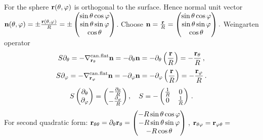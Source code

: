 \documentclass[12pt]{article}
\theoremstyle{theorem}
\numberwithin{equation}{section}
\begin{document}
For the sphere ${\bf r}(\theta,\varphi)$ is orthogonal to the surface.
       Hence
   normal unit vector
   $   {\bf n}(\theta,\varphi)=\pm {{\bf r}(\theta,\varphi)\over R}=\pm
   \begin{pmatrix}
    \sin\theta\cos\varphi\cr
     \sin\theta\sin\varphi\cr
      \cos\theta\cr
   \end{pmatrix}$.
           Choose ${\bf n}= {{\bf r}\over R}=
   \begin{pmatrix}
    \sin\theta\cos\varphi\cr
     \sin\theta\sin\varphi\cr
      \cos\theta\cr
   \end{pmatrix}.
     $
     Weingarten operator
     \begin{equation*}\label{weingrartenforcylinder}
        S\partial_\theta=-\nabla^{\rm can.flat}_{{\bf r}_\theta}{\bf n}=-\partial_\theta {\bf n}=
          -\partial_\theta\left({{\bf r}\over R}\right)=-{{\bf r}_\theta\over R}\,,
       \end{equation*}
       \begin{equation*}\label{weingrartenforcylinder}
       S\partial_\varphi=-\nabla^{\rm can.flat}_{{\bf r}_\varphi}{\bf n}=-\partial_\varphi {\bf n}=
          -\partial_\varphi\left({{\bf r}\over R}\right)=-{{\bf r}_\varphi\over R}\,.
    \end{equation*}
\begin{equation}\label{weingrartenforcylinder2}
           S
   \begin{pmatrix}
        \partial_\theta \cr
        \partial_\varphi\cr
   \end{pmatrix}=
   \begin{pmatrix}
         -{\partial_\theta\over R}\cr
        -{\partial_\varphi\over R}\cr
   \end{pmatrix},\quad S=
        -
   \begin{pmatrix}{1\over R}&0\cr 0 &{1\over R}\end{pmatrix}\,.
    \end{equation}
For second quadratic form:  ${\bf r}_{\theta\theta}=\partial_\theta{\bf r}_\theta=
  \begin{pmatrix}
        -R\sin\theta\cos\varphi\\
        -R\sin\theta\sin\varphi\\
        -R\cos\theta\\
   \end{pmatrix}\,$, ${\bf r}_{\theta\varphi}={\bf r}_{\varphi \theta}=$
\end{document}

